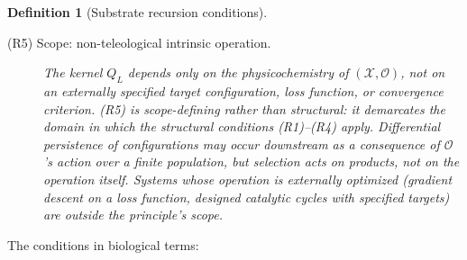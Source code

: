 \documentclass[aps,prx,reprint,amsmath,amssymb,floatfix,superscriptaddress,nofootinbib]{revtex4-2}
\theoremstyle{plain-thm}
\theoremstyle{definition-thm}
\newtheorem{definition}[theorem]{Definition}
\newcommand{\Xset}{\mathcal{X}}
\newcommand{\Op}{\mathcal{O}}
\begin{document}
\begin{definition}[Substrate recursion conditions]
\begin{description}
\item[(R5) Scope: non-teleological intrinsic operation.] The kernel $Q_L$ depends only on the physicochemistry of $(\Xset, \Op)$, not on an externally specified target configuration, loss function, or convergence criterion. (R5) is scope-defining rather than structural: it demarcates the domain in which the structural conditions (R1)--(R4) apply. Differential persistence of configurations may occur downstream as a consequence of $\Op$'s action over a finite population, but selection acts on products, not on the operation itself. Systems whose operation is externally optimized (gradient descent on a loss function, designed catalytic cycles with specified targets) are outside the principle's scope.
\end{description}
\end{definition}

The conditions in biological terms:
\end{document}

